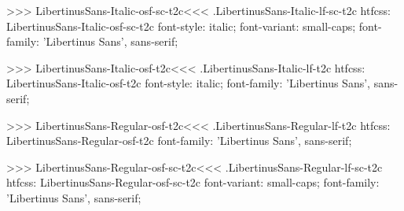 {{{{{{{{{{>>>
\<LibertinusSans-Italic-osf-sc-t2c\><<<
.LibertinusSans-Italic-lf-sc-t2c
htfcss:  LibertinusSans-Italic-osf-sc-t2c  font-style: italic; font-variant: small-caps; font-family: 'Libertinus Sans', sans-serif;

>>>
\<LibertinusSans-Italic-osf-t2c\><<<
.LibertinusSans-Italic-lf-t2c
htfcss:  LibertinusSans-Italic-osf-t2c  font-style: italic; font-family: 'Libertinus Sans', sans-serif;

>>>
\<LibertinusSans-Regular-osf-t2c\><<<
.LibertinusSans-Regular-lf-t2c
htfcss:  LibertinusSans-Regular-osf-t2c  font-family: 'Libertinus Sans', sans-serif;

>>>
\<LibertinusSans-Regular-osf-sc-t2c\><<<
.LibertinusSans-Regular-lf-sc-t2c
htfcss:  LibertinusSans-Regular-osf-sc-t2c  font-variant: small-caps; font-family: 'Libertinus Sans', sans-serif;

}}}}}}}}}}
